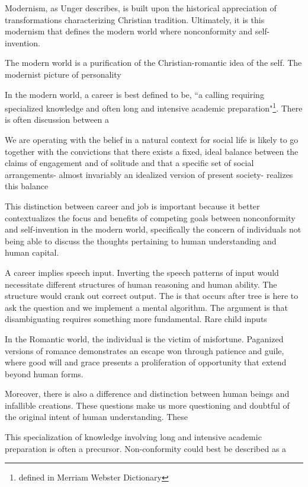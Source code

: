 \documentclass[12pt,letterpaper]{article}
\newif\ifdraft
\begin{document}
Modernism, as Unger describes, is built upon the historical appreciation of transformations characterizing Christian tradition.  Ultimately, it is this modernism that defines the modern world where nonconformity and self-invention.  

The modern world is a purification of the Christian-romantic idea of the self.  The modernist picture of personality 


In the modern world, a career is best defined to be, ``a calling requiring specialized knowledge and often long and intensive academic preparation"\footnote{defined in Merriam Webster Dictionary}.  There is often discussion between a 

We are operating with the belief in a natural context for social life is likely to go together with the convictions that there exists a fixed, ideal balance between the claims of engagement and of solitude and that a specific set of social arrangements- almost invariably an idealized version of present society- realizes this balance

This distinction between career and job is important because it better contextualizes the focus and benefits of competing goals between nonconformity and self-invention in the modern world, specifically the concern of individuals not being able to discuss the thoughts pertaining to human understanding and human capital.  
\fi
\ifdraft

A career implies speech input.  Inverting the speech patterns of input would necessitate different structures of human reasoning and human ability.  The structure would crank out correct output.  The is that occurs after tree is here to ask the question and we implement a mental algorithm.  The argument is that disambiguating requires something more fundamental.  Rare child inputs

In the Romantic world, the individual is the victim of misfortune.  Paganized versions of romance demonstrates an escape won through patience and guile, where good will and grace presents a proliferation of opportunity that extend beyond human forms.

Moreover, there is also a difference and distinction between human beings and infallible creations.  These questions make us more questioning and doubtful of the original intent of human understanding.  These

This specialization of knowledge involving long and intensive academic preparation is often a precursor.
Non-conformity could best be described as a 
\end{document}
